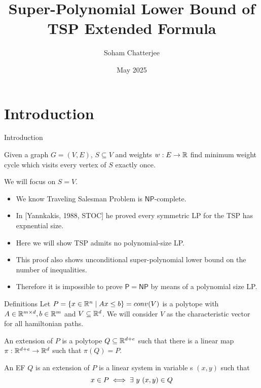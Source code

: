 \documentclass[aspectratio=1610]{beamer}
\title{Super-Polynomial Lower Bound of TSP Extended Formula}
\date{May 2025}
\author{Soham Chatterjee}
\renewcommand{\P}{\ensuremath{\mathsf{P}}}
\newcommand{\NP}{\ensuremath{\mathsf{NP}}}
\begin{document}
\begin{frame}
	\titlepage
\end{frame}

\section{Introduction}
\begin{frame}{Introduction}
	\begin{definition}
		Given a graph $G=(V,E)$, $S\subseteq V$ and weights $w:E\to \mathbb{R}$ find minimum weight cycle which visits every vertex of $S$ exactly once.
	\end{definition}\pause

	We will focus on $S=V$. 
	\begin{itemize}
        \item We know Traveling Salesman Problem is $\NP$-complete. 
        \item In [Yannkakis, 1988, STOC] he proved every symmetric LP for the TSP has expnential size.
        \item Here we will show TSP admits no polynomial-size LP.
        \item This proof also shows unconditional super-polynomial lower bound on the number of inequalities.
        \item Therefore it is impossible to prove $\P=\NP$ by means of a polynomial size LP.
    \end{itemize}
\end{frame}
\begin{frame}{Definitions}
	Let $P=\{x\in\mathbb{R}^n\mid Ax\leq b\}=conv(V)$ is a polytope  with $A\in\mathbb{R}^{m\times d}, b\in \mathbb{R}^m$ and $V\subseteq \mathbb{R}^d$. We will consider $V$ as the characteristic vector for all hamiltonian paths.\pause

	\begin{definition}
		An extension of $P$ is a polytope $Q\subseteq \mathbb{R}^{d+e}$ such that there is a linear map $\pi:\mathbb{R}^{d+e}\to\mathbb{R}^{d}$ such that $\pi(Q)=P$.
	\end{definition}\pause

	\begin{definition}
			An EF $Q$ is an extension of $P$ is a linear system in variable s $(x,y)$ such that $$x\in P\iff \exists\ y\ (x,y)\in Q$$\pause

	\end{definition}
\end{frame}
\end{document}
